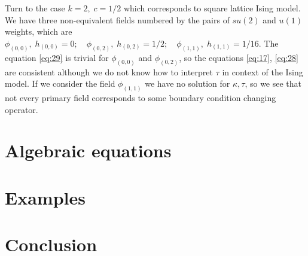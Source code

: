 \documentclass[a4paper]{article}
\theoremstyle{definition}
\theoremstyle{definition} \newtheorem{Def}{Definition}
\begin{document}
Turn to the case $k=2, \;c=1/2$ which corresponds to square lattice Ising model. We have three
non-equivalent fields numbered by the pairs of $su(2)$ and $u(1)$ weights, which are $\phi_{(0,0)},
\; h_{(0,0)}=0; \quad \phi_{(0,2)}, \; h_{(0,2)}=1/2; \quad \phi_{(1,1)}, \; h_{(1,1)}=1/16$. The
equation \eqref{eq:29} is trivial for $\phi_{(0,0)}$ and $\phi_{(0,2)}$, so the equations
\eqref{eq:17}, \eqref{eq:28} are consistent although we do not know how to interpret $\tau$ in
context of the Ising model. If we consider the field $\phi_{(1,1)}$ we have no solution for
$\kappa,\tau$, so we see that not every primary field corresponds to some boundary condition
changing operator.


\section{Algebraic equations}
\label{sec:algebraic-equations}

\section{Examples}
\label{sec:examples}

\section{Conclusion}
\label{sec:conclusion}

{}

\end{document}
